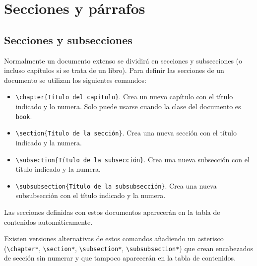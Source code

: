 \documentclass[
  spanish,
  a4paper,
]{scrreport}
\providecommand{\tightlist}{%
  \setlength{\itemsep}{0pt}\setlength{\parskip}{0pt}}
\theoremstyle{definition}
\theoremstyle{remark}
\begin{document}

\chapter{Secciones y párrafos}\label{secciones-y-puxe1rrafos}

\section{Secciones y subsecciones}\label{secciones-y-subsecciones}

Normalmente un documento extenso se dividirá en secciones y subsecciones
(o incluso capítulos si se trata de un libro). Para definir las
secciones de un documento se utilizan los siguientes comandos:

\begin{itemize}
\tightlist
\item
  \texttt{\textbackslash{}chapter\{Título\ del\ capítulo\}}. Crea un
  nuevo capítulo con el título indicado y lo numera. Solo puede usarse
  cuando la clase del documento es \texttt{book}.
\item
  \texttt{\textbackslash{}section\{Título\ de\ la\ sección\}}. Crea una
  nueva sección con el título indicado y la numera.
\item
  \texttt{\textbackslash{}subsection\{Título\ de\ la\ subsección\}}.
  Crea una nueva subsección con el título indicado y la numera.
\item
  \texttt{\textbackslash{}subsubsection\{Título\ de\ la\ subsubsección\}}.
  Crea una nueva subsubsección con el título indicado y la numera.
\end{itemize}

Las secciones definidas con estos documentos aparecerán en la tabla de
contenidos automáticamente.

Existen versiones alternativas de estos comandos añadiendo un asterisco
(\texttt{\textbackslash{}chapter*}, \texttt{\textbackslash{}section*},
\texttt{\textbackslash{}subsection*},
\texttt{\textbackslash{}subsubsection*}) que crean encabezados de
sección sin numerar y que tampoco aparecerán en la tabla de contenidos.
\end{document}

